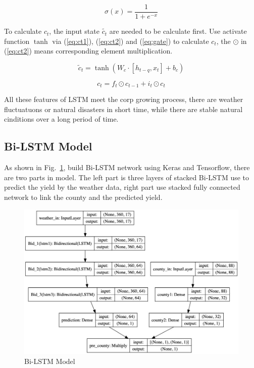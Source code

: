 \documentclass[conference]{IEEEtran}
\begin{document}
\begin{equation}
  \sigma \left( x \right) =\frac{1}{1+e^{-x}}
  \label{eq:sigmoid}
\end{equation}

To calculate $c_t$, the input state $\widetilde{c_t}$ are needed to be calculate first. Use activate function $\tanh$ via (\ref{eq:ct1}), (\ref{eq:ct2}) and (\ref{eq:gate}) to calculate $c_t$, the $\odot$ in (\ref{eq:ct2}) means corresponding element multiplication.

\begin{equation}
  \tilde{c}_t=\tanh \left( W_c\cdot \left[ h_{t-q},x_t \right] +b_c \right)
  \label{eq:ct1}
\end{equation}

\begin{equation}
  c_t=f_t\odot c_{t-1}+i_t\odot c_t
  \label{eq:ct2}
\end{equation}

All these features of LSTM meet the corp growing process, there are weather fluctuatuons or natural disasters in short time, while there are stable natural cinditions over a long period of time.

\subsection{Bi-LSTM Model}
As shown in Fig.~\ref{fig:model}, build Bi-LSTM network using Keras and Tensorflow, there are two parts in model. The left part is three layers of stacked Bi-LSTM use to predict the yield by the weather data, right part use stacked fully connected network to link the county and the predicted yield.



\begin{figure}[htbp]
  \centerline{\includegraphics[width=\linewidth]{figures/model.png}}
  \caption{Bi-LSTM Model}
  \label{fig:model}
\end{figure}
\end{document}

